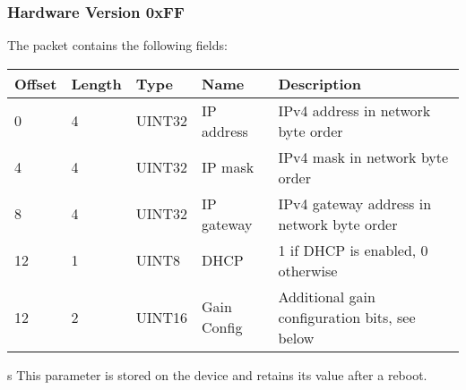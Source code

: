 \documentclass[a4paper,11pt]{article}
\begin{document}
\subsubsection{Hardware Version 0xFF}
The packet contains the following fields:
\begin{ThreePartTable}
\setlength\tabcolsep{3pt}

\begin{longtable}{p{} |  p{}  |  p{}| p{} | p{}}
\toprule
\textbf{Offset} &\textbf{Length} &\textbf{Type} & \textbf{Name} &\textbf{Description} \\ 
\hline
\endhead
\midrule[\heavyrulewidth]
\endfoot  
\midrule[\heavyrulewidth]
\endlastfoot

0 & 4 & UINT32 & IP address\tnote{s} & IPv4 address in network byte order \\
4 & 4 & UINT32 & IP mask\tnote{s} & IPv4 mask in network byte order \\
8 & 4 & UINT32 & IP gateway\tnote{s} & IPv4 gateway address in network byte order \\
12 & 1 & UINT8 & DHCP\tnote{s} & 1 if DHCP is enabled, 0 otherwise \\
12 & 2 & UINT16 & Gain Config & Additional gain configuration bits, see below \\
\end{longtable}   
\begin{tablenotes}
\item[s] This parameter is stored on the device and retains its value after a reboot.
\end{tablenotes}
\end{ThreePartTable}
\end{document}
